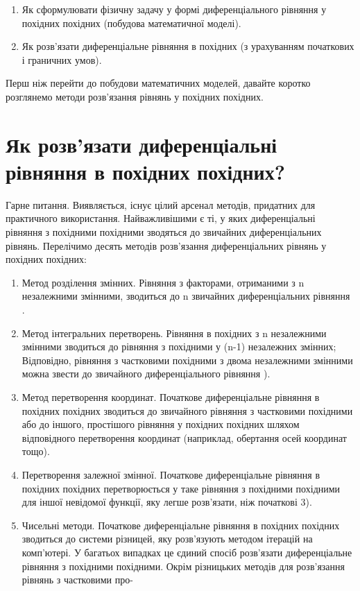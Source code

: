 \documentclass[
  ukrainian,
]{article}
\begin{document}
\begin{enumerate}
\def\labelenumi{\arabic{enumi}.}
\item
  Як сформулювати фізичну задачу у формі диференціального рівняння у
  похідних похідних (побудова математичної моделі).
\item
  Як розв'язати диференціальне рівняння в похідних (з урахуванням
  початкових і граничних умов).
\end{enumerate}

Перш ніж перейти до побудови математичних моделей, давайте коротко
розглянемо методи розв'язання рівнянь у похідних похідних.

\section{Як розв'язати диференціальні рівняння в похідних
похідних?}\label{ux44fux43a-ux440ux43eux437ux432ux44fux437ux430ux442ux438-ux434ux438ux444ux435ux440ux435ux43dux446ux456ux430ux43bux44cux43dux456-ux440ux456ux432ux43dux44fux43dux43dux44f-ux432-ux43fux43eux445ux456ux434ux43dux438ux445-ux43fux43eux445ux456ux434ux43dux438ux445}

Гарне питання. Виявляється, існує цілий арсенал методів, придатних для
практичного використання. Найважливішими є ті, у яких диференціальні
рівняння з похідними похідними зводяться до звичайних диференціальних
рівнянь. Перелічимо десять методів розв'язання диференціальних рівнянь у
похідних похідних:

\begin{enumerate}
\def\labelenumi{\arabic{enumi}.}
\item
  Метод розділення змінних. Рівняння з факторами, отриманими з n
  незалежними змінними, зводиться до n звичайних диференціальних
  рівняння .
\item
  Метод інтегральних перетворень. Рівняння в похідних з n незалежними
  змінними зводиться до рівняння з похідними у (n-1) незалежних змінних;
  Відповідно, рівняння з частковими похідними з двома незалежними
  змінними можна звести до звичайного диференціального рівняння ).
\item
  Метод перетворення координат. Початкове диференціальне рівняння в
  похідних похідних зводиться до звичайного рівняння з частковими
  похідними або до іншого, простішого рівняння у похідних похідних
  шляхом відповідного перетворення координат (наприклад, обертання осей
  координат тощо).
\item
  Перетворення залежної змінної. Початкове диференціальне рівняння в
  похідних похідних перетворюється у таке рівняння з похідними похідними
  для іншої невідомої функції, яку легше розв'язати, ніж початкові 3).
\item
  Чисельні методи. Початкове диференціальне рівняння в похідних похідних
  зводиться до системи різницей, яку розв'язують методом ітерацій на
  комп'ютері. У багатьох випадках це єдиний спосіб розв'язати
  диференціальне рівняння з похідними похідними. Окрім різницьких
  методів для розв'язання рівнянь з частковими про-
\end{enumerate}
\end{document}
